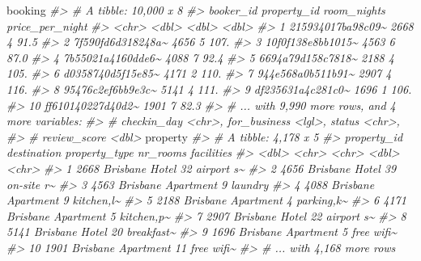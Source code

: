 \documentclass[
]{article}
\newenvironment{Shaded}{\begin{snugshade}}{\end{snugshade}}
\newcommand{\CommentTok}[1]{\textcolor[rgb]{0.56,0.35,0.01}{\textit{#1}}}
\newcommand{\NormalTok}[1]{#1}
\begin{document}
\begin{Shaded}
\begin{Highlighting}[]
\NormalTok{booking}
\CommentTok{\#\textgreater{} \# A tibble: 10,000 x 8}
\CommentTok{\#\textgreater{}    booker\_id         property\_id room\_nights price\_per\_night}
\CommentTok{\#\textgreater{}    \textless{}chr\textgreater{}                   \textless{}dbl\textgreater{}       \textless{}dbl\textgreater{}           \textless{}dbl\textgreater{}}
\CommentTok{\#\textgreater{}  1 215934017ba98c09\textasciitilde{}        2668           4            91.5}
\CommentTok{\#\textgreater{}  2 7f590fd6d318248a\textasciitilde{}        4656           5           107. }
\CommentTok{\#\textgreater{}  3 10f0f138e8bb1015\textasciitilde{}        4563           6            87.0}
\CommentTok{\#\textgreater{}  4 7b55021a4160dde6\textasciitilde{}        4088           7            92.4}
\CommentTok{\#\textgreater{}  5 6694a79d158c7818\textasciitilde{}        2188           4           105. }
\CommentTok{\#\textgreater{}  6 d0358740d5f15e85\textasciitilde{}        4171           2           110. }
\CommentTok{\#\textgreater{}  7 944e568a0b511b91\textasciitilde{}        2907           4           116. }
\CommentTok{\#\textgreater{}  8 95476c2ef6bb9e3c\textasciitilde{}        5141           4           111. }
\CommentTok{\#\textgreater{}  9 df235631a4c281c0\textasciitilde{}        1696           1           106. }
\CommentTok{\#\textgreater{} 10 ff610140227d40d2\textasciitilde{}        1901           7            82.3}
\CommentTok{\#\textgreater{} \# ... with 9,990 more rows, and 4 more variables:}
\CommentTok{\#\textgreater{} \#   checkin\_day \textless{}chr\textgreater{}, for\_business \textless{}lgl\textgreater{}, status \textless{}chr\textgreater{},}
\CommentTok{\#\textgreater{} \#   review\_score \textless{}dbl\textgreater{}}
\NormalTok{property}
\CommentTok{\#\textgreater{} \# A tibble: 4,178 x 5}
\CommentTok{\#\textgreater{}    property\_id destination property\_type nr\_rooms facilities}
\CommentTok{\#\textgreater{}          \textless{}dbl\textgreater{} \textless{}chr\textgreater{}       \textless{}chr\textgreater{}            \textless{}dbl\textgreater{} \textless{}chr\textgreater{}     }
\CommentTok{\#\textgreater{}  1        2668 Brisbane    Hotel               32 airport s\textasciitilde{}}
\CommentTok{\#\textgreater{}  2        4656 Brisbane    Hotel               39 on{-}site r\textasciitilde{}}
\CommentTok{\#\textgreater{}  3        4563 Brisbane    Apartment            9 laundry   }
\CommentTok{\#\textgreater{}  4        4088 Brisbane    Apartment            9 kitchen,l\textasciitilde{}}
\CommentTok{\#\textgreater{}  5        2188 Brisbane    Apartment            4 parking,k\textasciitilde{}}
\CommentTok{\#\textgreater{}  6        4171 Brisbane    Apartment            5 kitchen,p\textasciitilde{}}
\CommentTok{\#\textgreater{}  7        2907 Brisbane    Hotel               22 airport s\textasciitilde{}}
\CommentTok{\#\textgreater{}  8        5141 Brisbane    Hotel               20 breakfast\textasciitilde{}}
\CommentTok{\#\textgreater{}  9        1696 Brisbane    Apartment            5 free wifi\textasciitilde{}}
\CommentTok{\#\textgreater{} 10        1901 Brisbane    Apartment           11 free wifi\textasciitilde{}}
\CommentTok{\#\textgreater{} \# ... with 4,168 more rows}


\end{Highlighting}
\end{Shaded}
\end{document}
